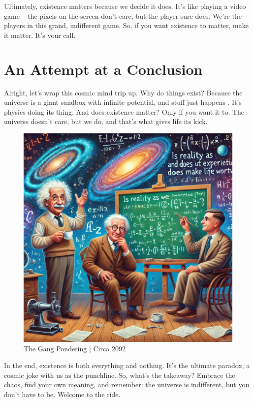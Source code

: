\documentclass{Axon}
\begin{document}
Ultimately, existence matters because we decide it does. It’s like playing a video game – the pixels on the screen don’t care, but the player sure does. We’re the players in this grand, indifferent game. So, if you want existence to matter, make it matter. It's your call.
\section{An Attempt at a Conclusion}
Alright, let's wrap this cosmic mind trip up. Why do things exist? Because the universe is a giant sandbox with infinite potential, and stuff just happens \cite{quantumJokes}. It’s physics doing its thing. And does existence matter? Only if you want it to. The universe doesn’t care, but we do, and that’s what gives life its kick.

\begin{figure}[h]
    \centering
    \includegraphics[width=0.35\linewidth]{TheGang.jpeg}
    \caption{The Gang Pondering | Circa 2092}
    \label{fig:The Gang}
\end{figure}

In the end, existence is both everything and nothing. It’s the ultimate paradox, a cosmic joke with us as the punchline. So, what’s the takeaway? Embrace the chaos, find your own meaning, and remember: the universe is indifferent, but you don't have to be. Welcome to the ride.

\printbibliography
\end{document}
